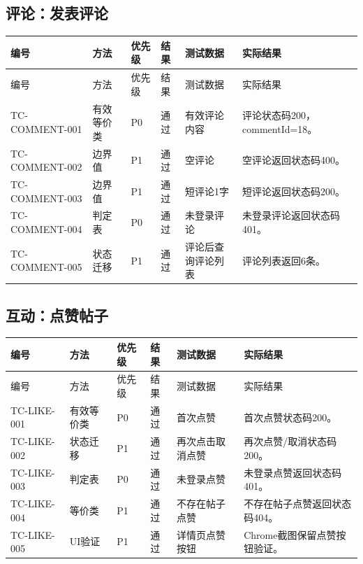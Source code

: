 \documentclass[bwprint]{report}
\begin{document}
\subsection{评论：发表评论}
{\footnotesize
\setlength{\tabcolsep}{3pt}
\begin{longtable}{P{2.0cm}P{2.0cm}P{0.9cm}P{0.9cm}P{3.4cm}P{5.4cm}}
\toprule
编号 & 方法 & 优先级 & 结果 & 测试数据 & 实际结果\\
\midrule
\endfirsthead
\toprule
编号 & 方法 & 优先级 & 结果 & 测试数据 & 实际结果\\
\midrule
\endhead
TC-COMMENT-001 & 有效等价类 & P0 & 通过 & 有效评论内容 & 评论状态码200，commentId=18。 \\
TC-COMMENT-002 & 边界值 & P1 & 通过 & 空评论 & 空评论返回状态码400。 \\
TC-COMMENT-003 & 边界值 & P1 & 通过 & 短评论1字 & 短评论返回状态码200。 \\
TC-COMMENT-004 & 判定表 & P0 & 通过 & 未登录评论 & 未登录评论返回状态码401。 \\
TC-COMMENT-005 & 状态迁移 & P1 & 通过 & 评论后查询评论列表 & 评论列表返回6条。 \\
\bottomrule
\end{longtable}
}
\subsection{互动：点赞帖子}
{\footnotesize
\setlength{\tabcolsep}{3pt}
\begin{longtable}{P{2.0cm}P{2.0cm}P{0.9cm}P{0.9cm}P{3.4cm}P{5.4cm}}
\toprule
编号 & 方法 & 优先级 & 结果 & 测试数据 & 实际结果\\
\midrule
\endfirsthead
\toprule
编号 & 方法 & 优先级 & 结果 & 测试数据 & 实际结果\\
\midrule
\endhead
TC-LIKE-001 & 有效等价类 & P0 & 通过 & 首次点赞 & 首次点赞状态码200。 \\
TC-LIKE-002 & 状态迁移 & P1 & 通过 & 再次点击取消点赞 & 再次点赞/取消状态码200。 \\
TC-LIKE-003 & 判定表 & P0 & 通过 & 未登录点赞 & 未登录点赞返回状态码401。 \\
TC-LIKE-004 & 等价类 & P1 & 通过 & 不存在帖子点赞 & 不存在帖子点赞返回状态码404。 \\
TC-LIKE-005 & UI验证 & P1 & 通过 & 详情页点赞按钮 & Chrome截图保留点赞按钮验证。 \\
\bottomrule
\end{longtable}
}
\end{document}
